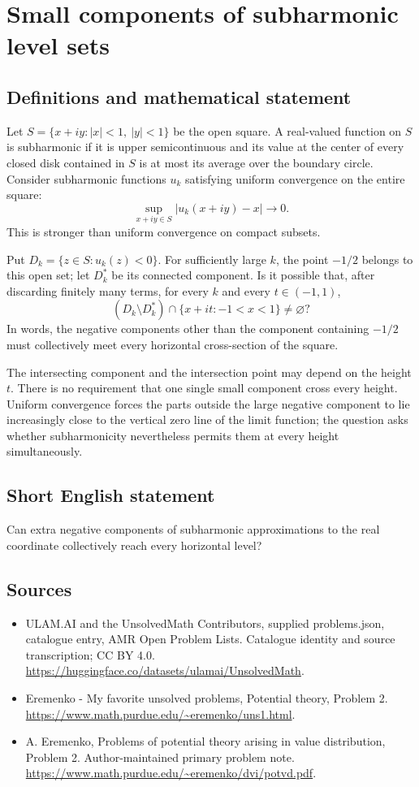 \documentclass[11pt,a4paper]{article}
\begin{document}
\section*{Small components of subharmonic level sets}\label{statement}

\subsection{Definitions and mathematical statement}
Let $S=\{x+iy:|x|<1,\ |y|<1\}$ be the open square.
A real-valued function on $S$ is subharmonic if it is upper
semicontinuous and its value at the center of every closed
disk contained in $S$ is at most its average over the
boundary circle.
Consider subharmonic functions $u_k$ satisfying uniform
convergence on the entire square:
\[
             \sup_{x+iy\in S}|u_k(x+iy)-x|\longrightarrow0.
\]
This is stronger than uniform convergence on compact subsets.

Put $D_k=\{z\in S:u_k(z)<0\}$. For sufficiently large
$k$, the point $-1/2$ belongs to this open set; let
$D_k^*$ be its connected component. Is it possible that,
after discarding finitely many terms, for every $k$ and
every $t\in(-1,1)$,
\[
       (D_k\setminus D_k^*)\cap
             \{x+it:-1<x<1\}\ne\varnothing?
\]
In words, the negative components other than the component
containing $-1/2$ must collectively meet every horizontal
cross-section of the square.

The intersecting component and the intersection point may
depend on the height $t$. There is no requirement that one
single small component cross every height. Uniform convergence
forces the parts outside the large negative component to
lie increasingly close to the vertical zero line of the
limit function; the question asks whether subharmonicity
nevertheless permits them at every height simultaneously.
\subsection{Short English statement}
Can extra negative components of subharmonic approximations to the real coordinate collectively reach every horizontal level?
\subsection{Sources}
\begin{itemize}
\item[S1] ULAM.AI and the UnsolvedMath Contributors, supplied problems.json, catalogue entry, AMR Open Problem Lists. Catalogue identity and source transcription; CC BY 4.0.
\url{https://huggingface.co/datasets/ulamai/UnsolvedMath}.
\item[S2] Eremenko - My favorite unsolved problems, Potential theory, Problem 2. 
\url{https://www.math.purdue.edu/~eremenko/uns1.html}.
\item[S3] A. Eremenko, Problems of potential theory arising in value distribution, Problem 2. Author-maintained primary problem note.
\url{https://www.math.purdue.edu/~eremenko/dvi/potvd.pdf}.
\end{itemize}
\end{document}
